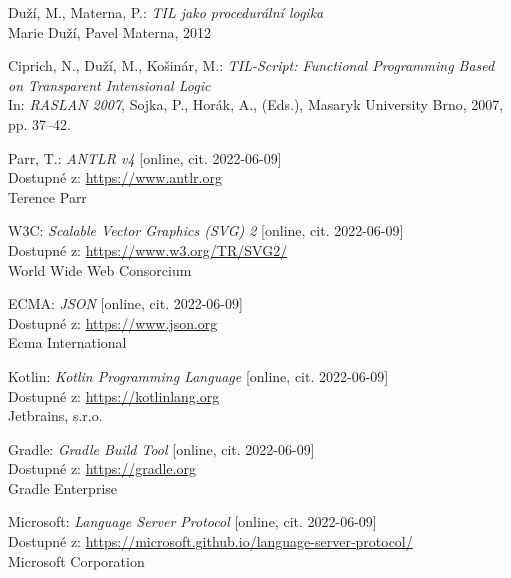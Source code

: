 \documentclass{article}
\begin{document}
\begin{thebibliography}{50}

Duží, M., Materna, P.: \textit{TIL jako procedurální logika} \\
Marie Duží, Pavel Materna, 2012

Ciprich, N., Duží, M., Košinár, M.: \textit{TIL-Script: Functional Programming Based on
Transparent Intensional Logic} \\
In: \textit{RASLAN 2007}, Sojka, P., Horák, A., (Eds.), Masaryk University Brno, 2007, pp. 37–42.

Parr, T.: \textit{ANTLR v4} [online, cit. 2022-06-09] \\
Dostupné z: \url{https://www.antlr.org} \\
Terence Parr

W3C: \textit{Scalable Vector Graphics (SVG) 2} [online, cit. 2022-06-09] \\
Dostupné z: \url{https://www.w3.org/TR/SVG2/} \\
World Wide Web Consorcium

ECMA: \textit{JSON} [online, cit. 2022-06-09] \\
Dostupné z: \url{https://www.json.org} \\
Ecma International

Kotlin: \textit{Kotlin Programming Language} [online, cit. 2022-06-09] \\
Dostupné z: \url{https://kotlinlang.org} \\
Jetbrains, s.r.o.

Gradle: \textit{Gradle Build Tool} [online, cit. 2022-06-09] \\
Dostupné z: \url{https://gradle.org} \\
Gradle Enterprise

Microsoft: \textit{Language Server Protocol} [online, cit. 2022-06-09] \\
Dostupné z: \url{https://microsoft.github.io/language-server-protocol/} \\
Microsoft Corporation

\end{thebibliography}
\end{document}
